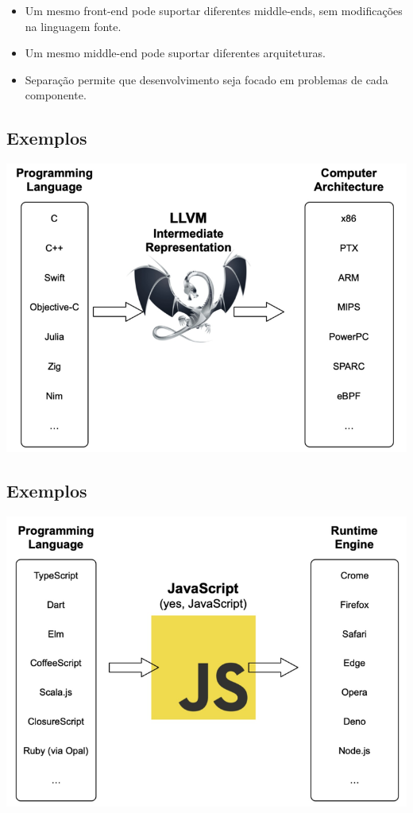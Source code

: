 \documentclass[11pt]{article}
\begin{document}
\begin{itemize}
\item Um mesmo front-end pode suportar diferentes middle-ends, sem modificações na linguagem fonte.
\item Um mesmo middle-end pode suportar diferentes arquiteturas.
\item Separação permite que desenvolvimento seja focado em problemas de cada componente.
\end{itemize}
\subsection*{Exemplos}
\label{sec:org6b7424f}

\begin{center}
\includegraphics[width=.9\linewidth]{ llvm1.png}
\end{center}
\subsection*{Exemplos}
\label{sec:orgebf449e}

\begin{center}
\includegraphics[width=.9\linewidth]{ javascript.png}
\end{center}
\end{document}

